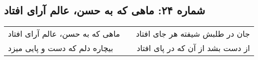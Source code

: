 \begin{center}
\section*{شماره ۲۴: ماهی که به حسن، عالم آرای افتاد}
\label{sec:024}
\begin{longtable}{l p{0.5cm} r}
ماهی که به حسن، عالم آرای افتاد
&&
جان در طلبش شیفته هر جای افتاد
\\
بیچاره دلم که دست و پایی میزد
&&
از دست بشد از آن که در پای افتاد
\\
\end{longtable}
\end{center}
